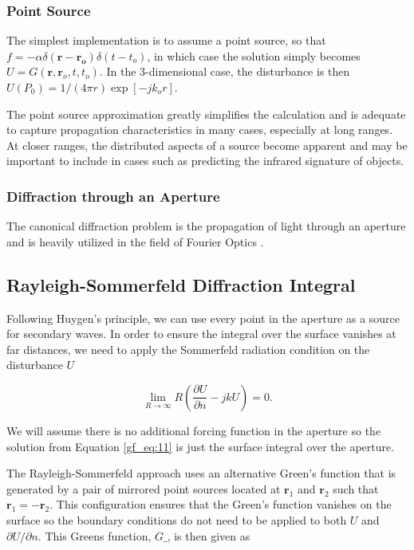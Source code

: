 \subsubsection{Point Source}
The simplest implementation is to assume a point source, so that $f= -\alpha \delta(\mathbf{r}-\mathbf{r_o})\delta(t-t_o)$, in which case the solution simply becomes $U = G(\mathbf{r},\mathbf{r}_o,t,t_o)$. In the 3-dimensional case, the disturbance is then $U(P_0) =1/(4\pi r)\exp[-jk_or]$.

The point source approximation greatly simplifies the calculation and is adequate to capture propagation characteristics in many cases, especially at long ranges. At closer ranges, the distributed aspects of a source become apparent and may be important to include in cases such as predicting the infrared signature of objects.

\subsubsection {Diffraction through an Aperture}
The canonical diffraction problem is the propagation of light through an aperture and is heavily utilized in the field of Fourier Optics \cite{goodman_fourier} \cite{gaskill_fourier}.

\subsection{Rayleigh-Sommerfeld Diffraction Integral}
Following Huygen's principle, we can use every point in the aperture as a source for secondary waves. In order to ensure the integral over the surface vanishes at far distances, we need to apply the Sommerfeld radiation condition on the disturbance $U$

\begin{equation}
 \lim_{R\to\infty} R\left(\frac{\partial U}{\partial n} -jkU \right) = 0.
\label{gf_eq:48}
\end{equation}
\renewcommand{\baselinestretch}{2} \small\normalsize

We will assume there is no additional forcing function in the aperture so the solution from Equation \ref{gf_eq:11} is just the surface integral over the aperture.

The Rayleigh-Sommerfeld approach uses an alternative Green's function that is generated by a pair of mirrored point sources located at $\mathbf{r}_1$ and $\mathbf{r}_2$ such that $\mathbf{r}_1 = -\mathbf{r}_2$. This configuration ensures that the Green's function vanishes on the surface so the boundary conditions do not need to be applied to both $U$ and $\partial U/\partial n$. This Greens function, $G\_$, is then given as

